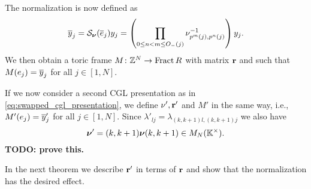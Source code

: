 The normalization is now defined as
\begin{equation*}
	\overline{y}_j = \mathcal{S}_{\boldsymbol{\nu}}(\overline{e}_j) y_j = \left(\prod_{0 \leq n < m \leq O_{-}(j)}\nu^{-1}_{p^m(j),p^n(j)}\right) y_j.
\end{equation*}
%
We then obtain a toric frame $M \colon \mathbb{Z}^N \to \operatorname{Fract}{R}$ with matrix $\mathbf{r}$ and
such that $M(e_j) = \overline{y}_j$ for all $j \in [1, N]$.

\medskip

If we now consider a second CGL presentation as in \cref{eq:swapped_cgl_presentation},
we define $\nu', \mathbf{r}'$ and $M'$ in the same way, i.e., $M'(e_j) = \overline{y}'_j$ for all $j
	\in [1, N]$. Since $\lambda'_{lj} = \lambda_{(k, k+1)l, (k, k+1)j}$ we also have
\begin{equation*}
	\boldsymbol{\nu}' = (k, k+1)\boldsymbol{\nu} (k, k+1) \in M_N(\mathbb{K}^\times).
\end{equation*}
\textbf{TODO: prove this.}

In the next theorem we describe $\mathbf{r}'$ in terms of $\mathbf{r}$ and show that the
normalization has the desired effect.

